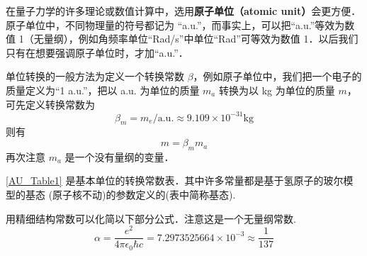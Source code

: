 
在量子力学的许多理论或数值计算中，选用\textbf{原子单位（atomic unit）}会更方便．原子单位中，不同物理量的符号都记为 “a.u.”，而事实上，可以把“a.u.”等效为数值 1（无量纲），例如角频率单位“Rad/s”中单位“Rad”可等效为数值 1．以后我们只有在想要强调原子单位时，才加“a.u.”．

单位转换的一般方法为定义一个转换常数 $\beta$，例如原子单位中，我们把一个电子的质量定义为“1 a.u.”，把以 a.u. 为单位的质量 $m_a$ 转换为以 kg 为单位的质量 $m$，可先定义转换常数为
\begin{equation}
{\beta _m} = {m_e}/\text{a.u.} \approx 9.109 \times {10^{ - 31}}\text{kg}
\end{equation}
则有
\begin{equation}
m = {\beta _m}{m_a}
\end{equation}
再次注意 $m_a$ 是一个没有量纲的变量．

\autoref{AU_Table1} %
是基本单位的转换常数表．其中许多常量都是基于氢原子的玻尔模型的基态%
(原子核不动)的参数定义的(表中简称基态).

用精细结构常数可以化简以下部分公式．注意这是一个无量纲常数.
\begin{equation}
\alpha  = \frac{{{e^2}}}{{4\pi {\epsilon _0}\hbar c}} = 7.2973525664 \times {10^{ - 3}} \approx \frac{1}{{137}}
\end{equation}

